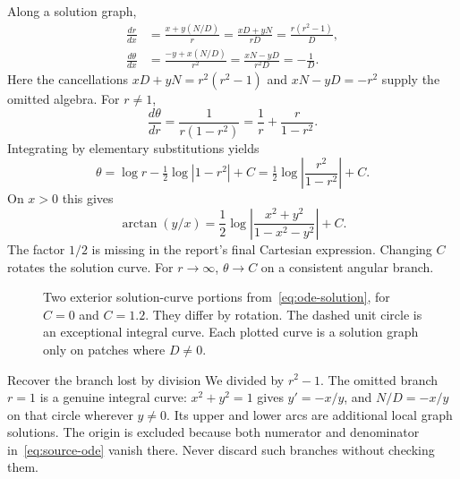 \documentclass[11pt,a4paper]{article}
\numberwithin{equation}{section}
\theoremstyle{definition}
\theoremstyle{plain}
\theoremstyle{remark}
\begin{document}
Along a solution graph,
\begin{align*}
\frac{dr}{dx}&=\frac{x+y(N/D)}r
=\frac{xD+yN}{rD}
=\frac{r(r^2-1)}D,\\
\frac{d\theta}{dx}&=\frac{-y+x(N/D)}{r^2}
=\frac{xN-yD}{r^2D}=-\frac1D.
\end{align*}
Here the cancellations $xD+yN=r^2(r^2-1)$ and $xN-yD=-r^2$ supply the omitted algebra. For $r\ne1$,
\[
\frac{d\theta}{dr}=\frac1{r(1-r^2)}
=\frac1r+\frac{r}{1-r^2}.
\]
Integrating by elementary substitutions yields
\begin{equation}\label{eq:ode-solution}
\boxed{\theta=\log r-\tfrac12\log|1-r^2|+C
=\tfrac12\log\left|\frac{r^2}{1-r^2}\right|+C.}
\end{equation}
On $x>0$ this gives
\[
\boxed{\arctan(y/x)=\frac12\log\left|\frac{x^2+y^2}{1-x^2-y^2}\right|+C.}
\]
The factor $1/2$ is missing in the report's final Cartesian expression. Changing $C$ rotates the solution curve. For $r\to\infty$, $\theta\to C$ on a consistent angular branch.

\begin{figure}[htbp]\centering
{}
\caption{Two exterior solution-curve portions from~\eqref{eq:ode-solution}, for $C=0$ and $C=1.2$. They differ by rotation. The dashed unit circle is an exceptional integral curve. Each plotted curve is a solution graph only on patches where $D\ne0$.}
\end{figure}

\begin{idea}{Recover the branch lost by division}
We divided by $r^2-1$. The omitted branch $r=1$ is a genuine integral curve: $x^2+y^2=1$ gives $y'=-x/y$, and $N/D=-x/y$ on that circle wherever $y\ne0$. Its upper and lower arcs are additional local graph solutions. The origin is excluded because both numerator and denominator in~\eqref{eq:source-ode} vanish there. Never discard such branches without checking them.
\end{idea}
\end{document}
